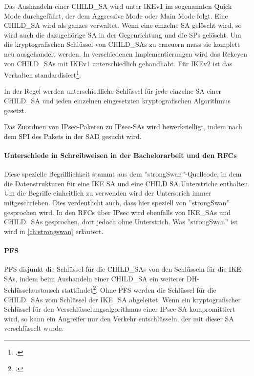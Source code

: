 Das Aushandeln einer CHILD\_SA wird unter IKEv1 im sogenannten Quick Mode durchgeführt, der dem Aggressive Mode
oder Main Mode folgt.
Eine CHILD\_SA wird als ganzes verwaltet. Wenn eine einzelne \ac{SA} gelöscht wird, so wird
auch die dazugehörige \ac{SA} in der Gegenrichtung und die \acp{SP} gelöscht.
Um die kryptografischen Schlüssel von CHILD\_SAs zu erneuern muss sie komplett neu ausgehandelt werden.
In verschiedenen Implementierungen wird das Rekeyen von CHILD\_SAs mit IKEv1 unterschiedlich gehandhabt.
Für IKEv2 ist das Verhalten standardisiert\footcite[][16]{charlie_kaufman_rfc_2014}.

In der Regel werden unterschiedliche Schlüssel für jede einzelne SA einer CHILD\_SA
und jeden einzelnen eingesetzten kryptografischen Algorithmus gesetzt.

Das Zuordnen von \ac{IPsec}-Paketen zu \ac{IPsec}-\acp{SA} wird bewerkstelligt,
indem nach dem \ac{SPI} des Pakets in der \ac{SAD} gesucht wird.

\paragraph{Unterschiede in Schreibweisen in der Bachelorarbeit und den RFCs}
Diese spezielle Begrifflichkeit stammt aus dem ''strongSwan''-Quellcode, in dem
die Datenstrukturen für eine IKE SA und eine CHILD SA Unterstriche enthalten.
Um die Begriffe einheitlich zu verwenden wird der Unterstrich immer mitgeschrieben.
Dies verdeutlicht auch, dass hier speziell von ''strongSwan'' gesprochen wird.
In den \acp{RFC} über \ac{IPsec} wird ebenfalls von IKE\_SAs und CHILD\_SAs gesprochen,
dort jedoch ohne Unterstrich. Was ''strongSwan'' ist wird in \autoref{ch:strongswan} erläutert.

\paragraph{PFS}
\ac{PFS} disjunkt die Schlüssel für die CHILD\_SAs von den Schlüsseln
für die \ac{IKE}-\acp{SA}, indem beim Aushandeln einer CHILD\_SA ein weiterer
\ac{DH}-Schlüsselaustausch stattfindet\footcite[13]{charlie_kaufman_rfc_2014}.
Ohne \ac{PFS} werden die Schlüssel für die CHILD\_SAs vom Schlüssel der IKE\_SA
abgeleitet. Wenn ein kryptografischer Schlüssel für den Verschlüsselungsalgorithmus
einer \ac{IPsec} \ac{SA} kompromittiert wird, so kann ein Angreifer nur den Verkehr entschlüsseln,
der mit dieser \ac{SA} verschlüsselt wurde.


